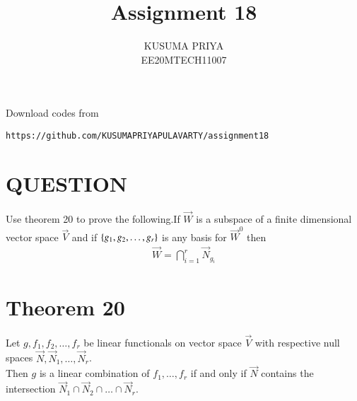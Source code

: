 \documentclass[journal,12pt,twocolumn]{IEEEtran}
\begin{document}
\renewcommand{\thefigure}{\theproblem}

\def\putbox#1#2#3{\makebox[0in][l]{\makebox[#1][l]{}\raisebox{\baselineskip}[0in][0in]{\raisebox{#2}[0in][0in]{#3}}}}
     \def\rightbox#1{\makebox[0in][r]{#1}}
     \def\centbox#1{\makebox[0in]{#1}}
     \def\topbox#1{\raisebox{-\baselineskip}[0in][0in]{#1}}
     \def\midbox#1{\raisebox{-0.5\baselineskip}[0in][0in]{#1}}
\vspace{3cm}
\title{Assignment 18}
\author{KUSUMA PRIYA\\EE20MTECH11007}

\maketitle
\newpage

\bigskip
\renewcommand{\thefigure}{\theenumi}
\renewcommand{\thetable}{\theenumi}
Download codes from 
%
\begin{lstlisting}
https://github.com/KUSUMAPRIYAPULAVARTY/assignment18
\end{lstlisting}
%
 
\section{QUESTION}
Use theorem 20 to prove the following.If $\vec{W}$ is a subspace of a finite dimensional vector space $\vec{V}$ and if $\left\{g_1,g_2,\hdots,g_r\right\}$ is any basis for $\vec{W}^0$ then
\begin{align}
    \vec{W}=\bigcap_{i=1}^r \vec{N}_{g_i}
\end{align}

%

\section{Theorem 20}
Let $g,f_1,f_2,\hdots,f_r$ be linear functionals on vector space $\vec{V}$ with respective null spaces $\vec{N},\vec{N}_1,\hdots,\vec{N}_r$.\\Then $g$ is a linear combination of $f_1,\hdots ,f_r$ if and only if $\vec{N}$ contains the intersection $\vec{N}_1 \cap \vec{N}_2\cap \hdots \cap \vec{N}_r$.
\end{document}
